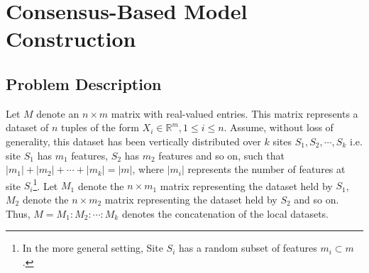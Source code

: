 %
%



\section{Consensus-Based Model Construction}
\label{conModel}

\subsection{Problem Description}
\label{sec:probdesc}
Let $M$ denote an $n \times m$ matrix with real-valued entries.  This matrix 
represents a dataset of $n$ tuples of the form $X_i \in \mathbb{R}^m, 1 \le i \le n$.    
Assume, without loss of generality, this dataset has been vertically distributed over
$k$ sites $S_1, S_2, \cdots, S_k$ i.e. site $S_1$ has $m_1 $ features, $S_2$ has $m_2$ features
and so on, such that $|m_1| + |m_2|+ \cdots + |m_k| = |m|$,
where $|m_i|$ represents the number of features at site $S_i$\footnote{In the more general setting,
Site $S_i$ has a random subset of features $m_i \subset m$.}. 
Let $M_1$ denote the $n \times m_1$ matrix representing the dataset held by $S_1$,
$M_2$ denote the $n \times m_2$ matrix representing the dataset held by $S_2$ and so on.
Thus, $M = M_1:M_2: \cdots : M_k$ denotes the concatenation of the local datasets. 

